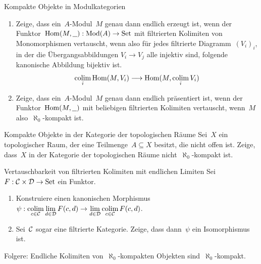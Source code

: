 \documentclass{uebblatt}
\begin{document}

\begin{aufgabe}{Kompakte Objekte in Modulkategorien}
\begin{enumerate}
\item Zeige, dass ein~$A$-Modul~$M$ genau dann endlich erzeugt ist, wenn der
Funktor~$\mathrm{Hom}(M,\underline{\ \ }) : \mathrm{Mod}(A) \to \mathrm{Set}$ mit filtrierten
Kolimiten von Monomorphismen vertauscht, wenn also für jedes filtrierte
Diagramm~$(V_i)_i$, in der die Übergangsabbildungen $V_i \to V_j$ alle injektiv
sind, folgende kanonische Abbildung bijektiv ist.
\[ \operatorname*{colim}_i \mathrm{Hom}(M,V_i) \longrightarrow \mathrm{Hom}(M, \operatorname*{colim}_i V_i) \]
\vspace{-1.7em}
\item Zeige, dass ein~$A$-Modul~$M$ genau dann endlich präsentiert ist, wenn
der Funktor~$\mathrm{Hom}(M,\underline{\ \ })$ mit beliebigen filtrierten Kolimiten
vertauscht, wenn~$M$ also~$\aleph_0$-kompakt ist.
\end{enumerate}
\end{aufgabe}

\begin{aufgabe}{Kompakte Objekte in der Kategorie der topologischen Räume}
Sei~$X$ ein topologischer Raum, der eine Teilmenge~$A \subseteq X$ besitzt, die
nicht offen ist. Zeige, dass~$X$ in der Kategorie der topologischen Räume
nicht~$\aleph_0$-kompakt ist.
\end{aufgabe}

\begin{aufgabe}{Vertauschbarkeit von filtrierten Kolimiten mit endlichen Limiten}
Sei~$F : \mathcal{C} \times \mathcal{D} \to \mathrm{Set}$ ein Funktor.
\begin{enumerate}
\item Konstruiere einen kanonischen Morphismus~$\psi : \operatorname*{colim}\limits_{c \in \mathcal{C}}
\lim\limits_{d \in \mathcal{D}} F(c,d) \to \lim\limits_{d \in \mathcal{D}} \operatorname*{colim}\limits_{c \in \mathcal{C}} F(c,d)$.
\item Sei~$\mathcal{C}$ sogar eine filtrierte Kategorie. Zeige, dass dann~$\psi$ ein Isomorphismus ist.
\end{enumerate}
Folgere: Endliche Kolimiten von~$\aleph_0$-kompakten Objekten
sind~$\aleph_0$-kompakt.
\end{aufgabe}
\end{document}
